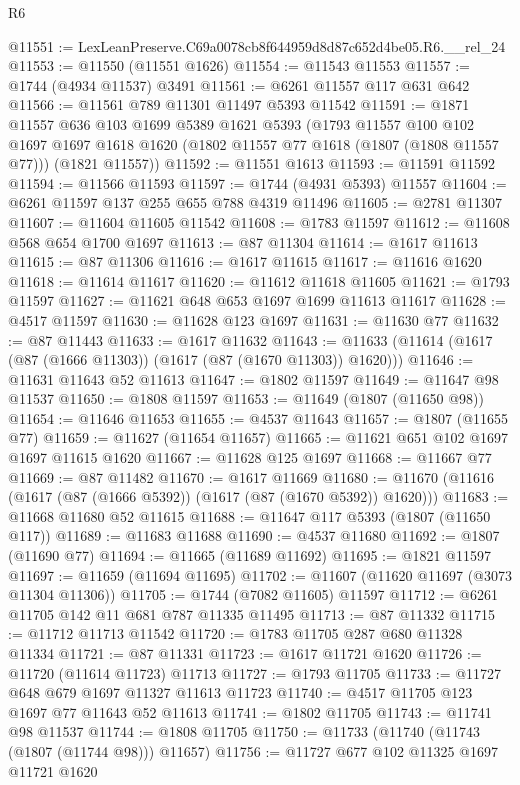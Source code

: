 \begin{lexlean}{R6}
\begin{coremodule}
@11551 := LexLeanPreserve.C69a0078cb8f644959d8d87c652d4be05.R6.__rel_24
@11553 := @11550 (@11551 @1626)
@11554 := @11543 @11553
@11557 := @1744 (@4934 @11537) @3491
@11561 := @6261 @11557 @117 @631 @642
@11566 := @11561 @789 @11301 @11497 @5393 @11542
@11591 := @1871
    @11557
    @636
    @103
    @1699
    @5389
    @1621
    @5393
    (@1793
      @11557
      @100
      @102
      @1697
      @1697
      @1618
      @1620
      (@1802 @11557 @77 @1618 (@1807 (@1808 @11557 @77)))
      (@1821 @11557))
@11592 := @11551 @1613
@11593 := @11591 @11592
@11594 := @11566 @11593
@11597 := @1744 (@4931 @5393) @11557
@11604 := @6261 @11597 @137 @255 @655 @788 @4319 @11496
@11605 := @2781 @11307
@11607 := @11604 @11605 @11542
@11608 := @1783 @11597
@11612 := @11608 @568 @654 @1700 @1697
@11613 := @87 @11304
@11614 := @1617 @11613
@11615 := @87 @11306
@11616 := @1617 @11615
@11617 := @11616 @1620
@11618 := @11614 @11617
@11620 := @11612 @11618 @11605
@11621 := @1793 @11597
@11627 := @11621 @648 @653 @1697 @1699 @11613 @11617
@11628 := @4517 @11597
@11630 := @11628 @123 @1697
@11631 := @11630 @77
@11632 := @87 @11443
@11633 := @1617 @11632
@11643 := @11633 (@11614 (@1617 (@87 (@1666 @11303)) (@1617 (@87 (@1670 @11303)) @1620)))
@11646 := @11631 @11643 @52 @11613
@11647 := @1802 @11597
@11649 := @11647 @98 @11537
@11650 := @1808 @11597
@11653 := @11649 (@1807 (@11650 @98))
@11654 := @11646 @11653
@11655 := @4537 @11643
@11657 := @1807 (@11655 @77)
@11659 := @11627 (@11654 @11657)
@11665 := @11621 @651 @102 @1697 @1697 @11615 @1620
@11667 := @11628 @125 @1697
@11668 := @11667 @77
@11669 := @87 @11482
@11670 := @1617 @11669
@11680 := @11670 (@11616 (@1617 (@87 (@1666 @5392)) (@1617 (@87 (@1670 @5392)) @1620)))
@11683 := @11668 @11680 @52 @11615
@11688 := @11647 @117 @5393 (@1807 (@11650 @117))
@11689 := @11683 @11688
@11690 := @4537 @11680
@11692 := @1807 (@11690 @77)
@11694 := @11665 (@11689 @11692)
@11695 := @1821 @11597
@11697 := @11659 (@11694 @11695)
@11702 := @11607 (@11620 @11697 (@3073 @11304 @11306))
@11705 := @1744 (@7082 @11605) @11597
@11712 := @6261 @11705 @142 @11 @681 @787 @11335 @11495
@11713 := @87 @11332
@11715 := @11712 @11713 @11542
@11720 := @1783 @11705 @287 @680 @11328 @11334
@11721 := @87 @11331
@11723 := @1617 @11721 @1620
@11726 := @11720 (@11614 @11723) @11713
@11727 := @1793 @11705
@11733 := @11727 @648 @679 @1697 @11327 @11613 @11723
@11740 := @4517 @11705 @123 @1697 @77 @11643 @52 @11613
@11741 := @1802 @11705
@11743 := @11741 @98 @11537
@11744 := @1808 @11705
@11750 := @11733 (@11740 (@11743 (@1807 (@11744 @98))) @11657)
@11756 := @11727 @677 @102 @11325 @1697 @11721 @1620

\end{coremodule}
\end{lexlean}
